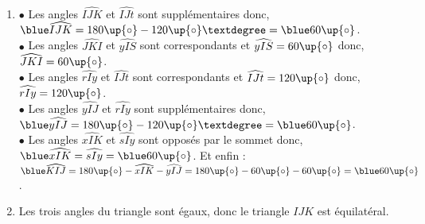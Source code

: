 \begin{corrige}
 \ \\ [-5mm]
    \begin{enumerate}
        \item $\bullet$ Les angles $\widehat{IJK}$ et $\widehat{IJt}$ sont supplémentaires donc, ${\blue \widehat{IJK}} =180\up{\circ}-120\up{\circ}° ={\blue 60\up{\circ}}$. \\
           $\bullet$ Les angles $\widehat{JKI}$ et $\widehat{yIS}$ sont correspondants et $\widehat{yIS} =60\up{\circ}$ donc, {\blue $\widehat{JKI} =60\up{\circ}$}. \\
           $\bullet$ Les angles $\widehat{rIy}$ et $\widehat{IJt}$ sont correspondants et $\widehat{IJt} =120\up{\circ}$ donc, {\blue $\widehat{rIy} =120\up{\circ}$}. \\
           $\bullet$ Les angles $\widehat{yIJ}$ et $\widehat{rIy}$ sont supplémentaires donc, ${\blue \widehat{yIJ}} =180\up{\circ}-120\up{\circ}° ={\blue 60\up{\circ}}$. \\
           $\bullet$ Les angles $\widehat{xIK}$ et $\widehat{sIy}$ sont opposés par le sommet donc, ${\blue \widehat{xIK}} =\widehat{sIy} ={\blue 60\up{\circ}}$. Et enfin : \\
           ${\blue \widehat{KIJ}} =180\up{\circ} -\widehat{xIK}-\widehat{yIJ} =180\up{\circ}-60\up{\circ}-60\up{\circ} ={\blue 60\up{\circ}}$.
        \item Les trois angles du triangle sont égaux, donc {\blue le triangle $IJK$ est équilatéral}.
    \end{enumerate}
 \end{corrige}
 